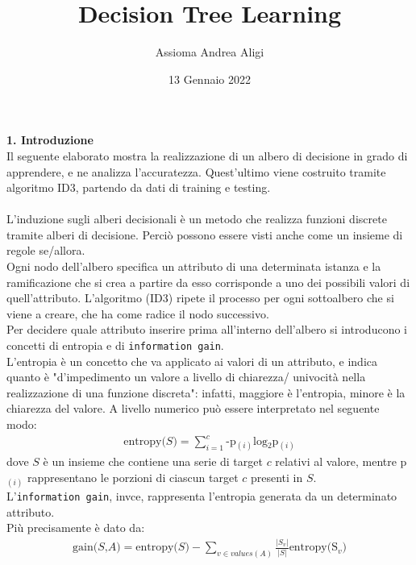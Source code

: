 \documentclass[]{article}
\begin{document}
\title{\textbf{Decision Tree Learning}}
\author{Assioma Andrea Aligi}
\date{13 Gennaio 2022}
\maketitle


{\Large \textbf{1. Introduzione}}\\
Il seguente elaborato mostra la realizzazione di un albero di decisione in grado di apprendere, e ne analizza l'accuratezza. 
Quest'ultimo viene costruito tramite algoritmo ID3, partendo da dati di training e testing.\\
\\
L'induzione sugli alberi decisionali è un metodo che realizza funzioni discrete tramite alberi di decisione. 
Perciò possono essere visti anche come un insieme di regole se/allora.\\
Ogni nodo dell'albero specifica un attributo di una determinata istanza e la ramificazione che si crea a partire da esso corrisponde a uno dei possibili valori di quell'attributo. 
L'algoritmo (ID3) ripete il processo per ogni sottoalbero che si viene a creare, che ha come radice il nodo successivo.\\
Per decidere quale attributo inserire prima all'interno dell'albero si introducono i concetti di entropia e di \texttt{information gain}.\\
L'entropia è un concetto che va applicato ai valori di un attributo, e indica quanto è "d'impedimento un valore a livello di chiarezza/ univocità nella realizzazione di una funzione discreta": infatti, maggiore è l'entropia, minore è la chiarezza del valore. 
A livello numerico può essere interpretato nel seguente modo:
\begin{equation}
    \begin{aligned} 
        \text{entropy($S$)} = \sum_{i=1}^c \text{-p$_{(i)}$log$_2$p$_{(i)}$}
    \end{aligned}
\end{equation}    
dove $S$ è  un insieme che contiene una serie di target $c$ relativi al valore, mentre p$_{(i)}$ rappresentano le porzioni di ciascun target $c$ presenti in $S$.\\ 
L'\texttt{information gain}, invce, rappresenta l'entropia generata da un determinato attributo.\\
Più precisamente è dato da:
\begin{equation}
    \begin{aligned}
        \text{gain($S$,$A$)} = \text{entropy($S$)} - \sum_{v \in values(A)} \frac{|S_{v}|}{|S|} \text{entropy(S$_v$)}
    \end{aligned}
\end{equation}
\end{document}
